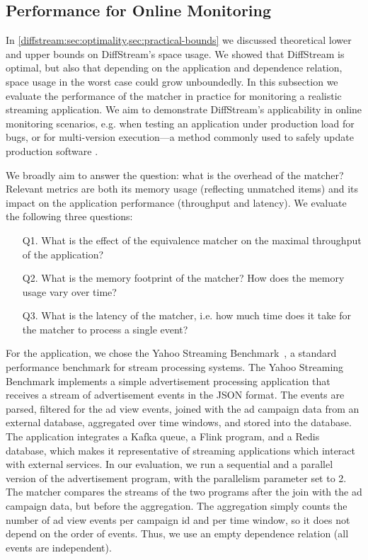 \subsection{Performance for Online Monitoring}
\label{diffstream:ssec:evaluation-onlinemonitoring}

In \cref{diffstream:sec:optimality,sec:practical-bounds} we discussed theoretical lower
and upper bounds on DiffStream's space usage. We showed that DiffStream is
optimal, but also that depending on the application and dependence relation, space usage in the worst case could grow unboundedly. In this subsection we
evaluate the performance of the matcher in practice for monitoring a realistic streaming application.
We aim to demonstrate DiffStream's applicability in online monitoring scenarios,
e.g. when testing an application under production load for bugs,
or for multi-version execution---a method commonly used to safely update
production software
\cite{tucek2009delta-execution,hosek2013safe,maurer2012tachyon}.

We broadly aim to answer the question: what is the overhead of the matcher?
Relevant metrics are both its memory usage (reflecting unmatched items) and its impact on the application performance (throughput and latency). We evaluate the following three questions:
\begin{enumerate}
  \item[Q1.] What is the effect of the equivalence matcher on the maximal
  throughput of the application?
  \item[Q2.] What is the memory footprint of the matcher? How does the memory usage vary over time?
  \item[Q3.] What is the latency of the matcher, i.e. how much time does
  it take for the matcher to process a single event?
\end{enumerate}

For the application, we chose the Yahoo Streaming
Benchmark~\cite{yahoostreaming2016}, a standard performance benchmark for stream processing systems.
The Yahoo
Streaming Benchmark implements a simple advertisement processing application
that receives a stream of advertisement events in the JSON format. The events
are parsed, filtered for the ad view events, joined with the ad campaign data
from an external database, aggregated over time windows, and stored into the
database. The application integrates a Kafka queue, a Flink program, and a
Redis database,
which makes it representative of streaming applications which interact with external services.
In our evaluation, we run a sequential and a parallel version of the
advertisement program, with the parallelism parameter set to 2. The
matcher compares the streams of the two programs
after the join with the ad campaign data,
but before the aggregation. The aggregation simply counts the number of
ad view events per campaign id and per time window, so it does not depend on
the order of events. Thus, we use an empty dependence relation (all events
are independent).

